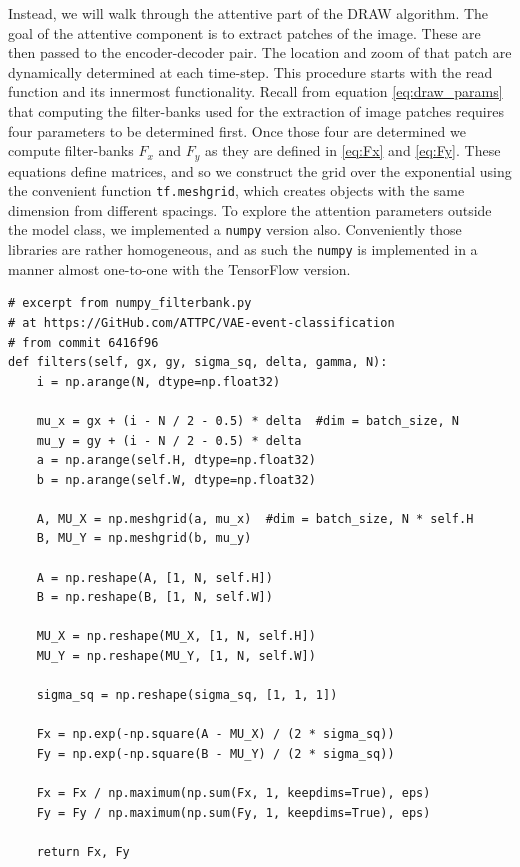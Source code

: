Instead, we will walk through the attentive part of the DRAW algorithm. The goal of the attentive component is to extract patches of the image. These are then passed to the encoder-decoder pair. The location and zoom of that patch are dynamically determined at each time-step. This procedure starts with the read function and its innermost functionality. Recall from equation \ref{eq:draw_params}  that computing the filter-banks used for the extraction of image patches requires four parameters to be determined first. Once those four are determined we compute filter-banks $F_x$ and $F_y$ as they are defined in \ref{eq:Fx} and \ref{eq:Fy}. These equations define matrices, and so we construct the grid over the exponential using the convenient function \lstinline{tf.meshgrid}, which creates objects with the same dimension from different spacings. To explore the attention parameters outside the model class, we implemented a \lstinline{numpy} version also. Conveniently those libraries are rather homogeneous, and as such the \lstinline{numpy} is implemented in a manner almost one-to-one with the TensorFlow version. 


\begin{minipage}{\linewidth}
\begin{lstlisting}[language=iPython]
# excerpt from numpy_filterbank.py
# at https://GitHub.com/ATTPC/VAE-event-classification
# from commit 6416f96
def filters(self, gx, gy, sigma_sq, delta, gamma, N):
    i = np.arange(N, dtype=np.float32)

    mu_x = gx + (i - N / 2 - 0.5) * delta  #dim = batch_size, N
    mu_y = gy + (i - N / 2 - 0.5) * delta
    a = np.arange(self.H, dtype=np.float32)
    b = np.arange(self.W, dtype=np.float32)

    A, MU_X = np.meshgrid(a, mu_x)  #dim = batch_size, N * self.H
    B, MU_Y = np.meshgrid(b, mu_y)

    A = np.reshape(A, [1, N, self.H])
    B = np.reshape(B, [1, N, self.W])

    MU_X = np.reshape(MU_X, [1, N, self.H])
    MU_Y = np.reshape(MU_Y, [1, N, self.W])

    sigma_sq = np.reshape(sigma_sq, [1, 1, 1])

    Fx = np.exp(-np.square(A - MU_X) / (2 * sigma_sq))
    Fy = np.exp(-np.square(B - MU_Y) / (2 * sigma_sq))

    Fx = Fx / np.maximum(np.sum(Fx, 1, keepdims=True), eps)
    Fy = Fy / np.maximum(np.sum(Fy, 1, keepdims=True), eps)

    return Fx, Fy
\end{lstlisting}
\end{minipage}

